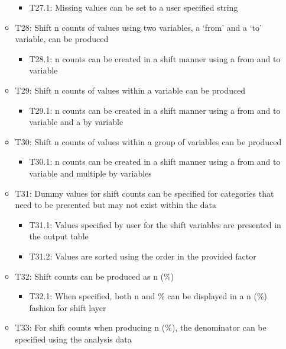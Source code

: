 \documentclass[
]{article}
\providecommand{\tightlist}{%
  \setlength{\itemsep}{0pt}\setlength{\parskip}{0pt}}
\begin{document}
\begin{itemize}
\begin{itemize}
    \begin{itemize}
    \tightlist
    \item
      T27.1: Missing values can be set to a user specified string
    \end{itemize}
  \item
    T28: Shift n counts of values using two variables, a `from' and a
    `to' variable, can be produced

    \begin{itemize}
    \tightlist
    \item
      T28.1: n counts can be created in a shift manner using a from and
      to variable
    \end{itemize}
  \item
    T29: Shift n counts of values within a variable can be produced

    \begin{itemize}
    \tightlist
    \item
      T29.1: n counts can be created in a shift manner using a from and
      to variable and a by variable
    \end{itemize}
  \item
    T30: Shift n counts of values within a group of variables can be
    produced

    \begin{itemize}
    \tightlist
    \item
      T30.1: n counts can be created in a shift manner using a from and
      to variable and multiple by variables
    \end{itemize}
  \item
    T31: Dummy values for shift counts can be specified for categories
    that need to be presented but may not exist within the data

    \begin{itemize}
    \tightlist
    \item
      T31.1: Values specified by user for the shift variables are
      presented in the output table
    \item
      T31.2: Values are sorted using the order in the provided factor
    \end{itemize}
  \item
    T32: Shift counts can be produced as n (\%)

    \begin{itemize}
    \tightlist
    \item
      T32.1: When specified, both n and \% can be displayed in a n (\%)
      fashion for shift layer
    \end{itemize}
  \item
    T33: For shift counts when producing n (\%), the denominator can be
    specified using the analysis data


\end{itemize}
\end{itemize}
\end{document}
